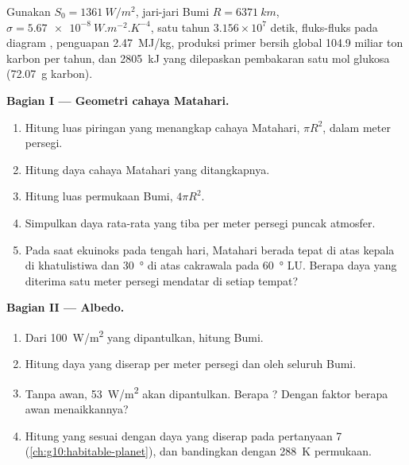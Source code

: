 \begin{problem}
\label{pb:g10:earth-energy-budget:1}
Gunakan $S_0 = \qty{1361}{W/m^2}$, jari-jari Bumi $R = \qty{6371}{km}$,
$\sigma = \qty{5.67e-8}{W.m^{-2}.K^{-4}}$, satu tahun $3.156\times10^7$
detik, fluks-fluks pada diagram ,  penguapan
\qty{2.47}{MJ/kg}, produksi primer bersih global \num{104.9} miliar ton
karbon per tahun, dan \qty{2805}{kJ} yang dilepaskan pembakaran satu mol
glukosa (\qty{72.07}{g} karbon).

\medskip
\noindent\textbf{Bagian I --- Geometri cahaya Matahari.}
\begin{enumerate}
  \item Hitung luas piringan yang menangkap cahaya Matahari, $\pi R^2$, dalam
        meter persegi.
  \item Hitung daya cahaya Matahari yang ditangkapnya.
  \item Hitung luas permukaan Bumi, $4\pi R^2$.
  \item Simpulkan daya rata-rata yang tiba per meter persegi puncak
        atmosfer.
  \item Pada saat ekuinoks pada tengah hari, Matahari berada tepat di atas
        kepala di khatulistiwa dan \qty{30}{\degree} di atas cakrawala pada
        \qty{60}{\degree} LU. Berapa daya yang diterima satu meter persegi
        mendatar di setiap tempat?
\end{enumerate}

\medskip
\noindent\textbf{Bagian II --- Albedo.}
\begin{enumerate}[resume]
  \item Dari \qty{100}{W/m^2} yang dipantulkan, hitung  Bumi.
  \item Hitung daya yang diserap per meter persegi dan oleh seluruh Bumi.
  \item Tanpa awan, \qty{53}{W/m^2} akan dipantulkan. Berapa ? Dengan
        faktor berapa awan menaikkannya?
  \item Hitung  yang sesuai dengan daya yang diserap pada
        pertanyaan 7 (\cref{ch:g10:habitable-planet}), dan bandingkan dengan
        \qty{288}{K} permukaan.
\end{enumerate}


\end{problem}
